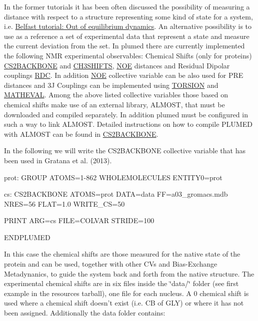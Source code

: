 In the former tutorials it has been often discussed the possibility of measuring a distance with respect to a structure representing some kind of state for a system, i.\+e. \hyperlink{belfast-5}{Belfast tutorial\+: Out of equilibrium dynamics}. An alternative possibility is to use as a reference a set of experimental data that represent a state and measure the current deviation from the set. In plumed there are currently implemented the following N\+M\+R experimental observables\+: Chemical Shifts (only for proteins) \hyperlink{CS2BACKBONE}{C\+S2\+B\+A\+C\+K\+B\+O\+N\+E} and \hyperlink{CH3SHIFTS}{C\+H3\+S\+H\+I\+F\+T\+S}, \hyperlink{NOE}{N\+O\+E} distances and Residual Dipolar couplings \hyperlink{RDC}{R\+D\+C}. In addition \hyperlink{NOE}{N\+O\+E} collective variable can be also used for P\+R\+E distances and 3\+J Couplings can be implemented using \hyperlink{TORSION}{T\+O\+R\+S\+I\+O\+N} and \hyperlink{MATHEVAL}{M\+A\+T\+H\+E\+V\+A\+L}. Among the above listed collective variables those based on chemical shifts make use of an external library, A\+L\+M\+O\+S\+T, that must be downloaded and compiled separately. In addition plumed must be configured in such a way to link A\+L\+M\+O\+S\+T. Detailed instructions on how to compile P\+L\+U\+M\+E\+D with A\+L\+M\+O\+S\+T can be found in \hyperlink{CS2BACKBONE}{C\+S2\+B\+A\+C\+K\+B\+O\+N\+E}.

In the following we will write the C\+S2\+B\+A\+C\+K\+B\+O\+N\+E collective variable that has been used in Gratana et al. (2013).

\begin{DoxyVerb}prot: GROUP ATOMS=1-862
WHOLEMOLECULES ENTITY0=prot

cs: CS2BACKBONE ATOMS=prot DATA=data FF=a03_gromacs.mdb NRES=56 FLAT=1.0 WRITE_CS=50 

PRINT ARG=cs FILE=COLVAR STRIDE=100

ENDPLUMED
\end{DoxyVerb}


In this case the chemical shifts are those measured for the native state of the protein and can be used, together with other C\+Vs and Bias-\/\+Exchange Metadynanics, to guide the system back and forth from the native structure. The experimental chemical shifts are in six files inside the \char`\"{}data/\char`\"{} folder (see first example in the resources tarball), one file for each nucleus. A 0 chemical shift is used where a chemical shift doesn't exist (i.\+e. C\+B of G\+L\+Y) or where it has not been assigned. Additionally the data folder contains\+:


